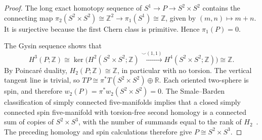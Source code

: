 \documentclass[11pt]{article}
\theoremstyle{definition}
\theoremstyle{remark}
\newcommand{\R}{\mathbb R}
\newcommand{\Z}{\mathbb Z}
\begin{document}
\begin{proof}
The long exact homotopy sequence of
$S^1\to P\to S^2\times S^2$ contains the connecting map
$\pi_2(S^2\times S^2)\cong\Z^2\to\pi_1(S^1)\cong\Z$, given by
$(m,n)\mapsto m+n$.
It is surjective because the first Chern class is primitive.  Hence
$\pi_1(P)=0$.

The Gysin sequence shows that
\[
 H^3(P;\Z)\cong\ker\bigl(H^2(S^2\times S^2;\Z)\xrightarrow{\smile(1,1)}H^4(S^2\times S^2;\Z)\bigr)\cong\Z.
\]
By Poincar\'e duality, $H_2(P;\Z)\cong\Z$, in particular with no torsion.
The vertical tangent line is trivial, so
$TP\cong\pi^*T(S^2\times S^2)\oplus\R$.
Each oriented two-sphere is spin, and therefore
$w_2(P)=\pi^*w_2(S^2\times S^2)=0$.
The Smale--Barden classification of simply connected five-manifolds implies
that a closed
simply connected spin five-manifold with torsion-free second homology is a
connected sum of copies of $S^2\times S^3$, with the number of summands
equal to the rank of $H_2$~\cite{Smale1962,Barden1965}.  The preceding
homology and spin calculations therefore give
$P\cong S^2\times S^3$.
\end{proof}






\end{document}
